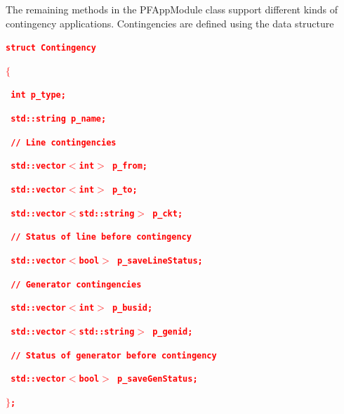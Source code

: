 \documentclass[12pt]{report} %
\begin{document}
The remaining methods in the PFAppModule class support different kinds of contingency applications. Contingencies are defined using the data structure

\textcolor{red}{\texttt{\textbf{struct Contingency}}}

\textcolor{red}{\texttt{\textbf{$\boldsymbol{\mathrm{\{}}$}}}

\textcolor{red}{\texttt{\textbf{  int p\_type;}}}

\textcolor{red}{\texttt{\textbf{  std::string p\_name;}}}

\textcolor{red}{\texttt{\textbf{  // Line contingencies}}}

\textcolor{red}{\texttt{\textbf{  std::vector$\boldsymbol{\mathrm{<}}$int$\boldsymbol{\mathrm{>}}$ p\_from;}}}

\textcolor{red}{\texttt{\textbf{  std::vector$\boldsymbol{\mathrm{<}}$int$\boldsymbol{\mathrm{>}}$ p\_to;}}}

\textcolor{red}{\texttt{\textbf{  std::vector$\boldsymbol{\mathrm{<}}$std::string$\boldsymbol{\mathrm{>}}$ p\_ckt;}}}

\textcolor{red}{\texttt{\textbf{  // Status of line before contingency}}}

\textcolor{red}{\texttt{\textbf{  std::vector$\boldsymbol{\mathrm{<}}$bool$\boldsymbol{\mathrm{>}}$ p\_saveLineStatus;}}}

\textcolor{red}{\texttt{\textbf{  // Generator contingencies}}}

\textcolor{red}{\texttt{\textbf{  std::vector$\boldsymbol{\mathrm{<}}$int$\boldsymbol{\mathrm{>}}$ p\_busid;}}}

\textcolor{red}{\texttt{\textbf{  std::vector$\boldsymbol{\mathrm{<}}$std::string$\boldsymbol{\mathrm{>}}$ p\_genid;}}}

\textcolor{red}{\texttt{\textbf{  // Status of generator before contingency}}}

\textcolor{red}{\texttt{\textbf{  std::vector$\boldsymbol{\mathrm{<}}$bool$\boldsymbol{\mathrm{>}}$ p\_saveGenStatus;}}}

\textcolor{red}{\texttt{\textbf{$\boldsymbol{\mathrm{\}}}$;}}}
\end{document}
